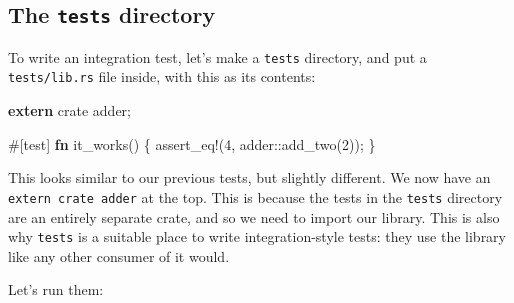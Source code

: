 \documentclass[a4paper,]{book}
\newenvironment{Shaded}{\begin{snugshade}}{\end{snugshade}}
\newcommand{\KeywordTok}[1]{\textcolor[rgb]{0.13,0.29,0.53}{\textbf{{#1}}}}
\newcommand{\DecValTok}[1]{\textcolor[rgb]{0.00,0.00,0.81}{{#1}}}
\newcommand{\OtherTok}[1]{\textcolor[rgb]{0.56,0.35,0.01}{{#1}}}
\newcommand{\NormalTok}[1]{{#1}}
\begin{document}
\subsection{\texorpdfstring{The \texttt{tests}
directory}{The tests directory}}\label{the-tests-directory}

To write an integration test, let's make a \texttt{tests} directory, and
put a \texttt{tests/lib.rs} file inside, with this as its contents:

\begin{Shaded}
\begin{Highlighting}[]
\KeywordTok{extern} \NormalTok{crate adder;}

\OtherTok{#[}\NormalTok{test}\OtherTok{]}
\KeywordTok{fn} \NormalTok{it_works() \{}
    \OtherTok{assert_eq!}\NormalTok{(}\DecValTok{4}\NormalTok{, adder::add_two(}\DecValTok{2}\NormalTok{));}
\NormalTok{\}}
\end{Highlighting}
\end{Shaded}

This looks similar to our previous tests, but slightly different. We now
have an \texttt{extern\ crate\ adder} at the top. This is because the
tests in the \texttt{tests} directory are an entirely separate crate,
and so we need to import our library. This is also why \texttt{tests} is
a suitable place to write integration-style tests: they use the library
like any other consumer of it would.

Let's run them:

\begin{Shaded}
\end{Shaded}
\end{document}
